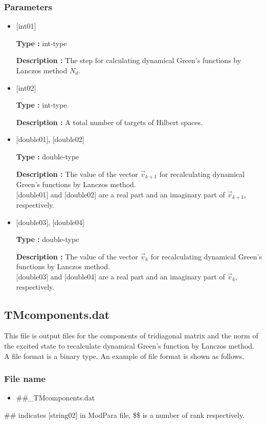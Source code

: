 \subsubsection{Parameters}
 \begin{itemize}

  \item  $[$int01$]$

 {\bf Type :} int-type

 {\bf Description :} The step for calculating dynamical Green's functions by Lanczos method $N_d$.

  \item  $[$int02$]$

 {\bf Type :} int-type

{\bf Description :}  A total number of targets of Hilbert spaces.

 
 \item  $[$double01$]$, $[$double02$]$

 {\bf Type :} double-type 

{\bf Description :} The value of the vector $\vec{v}_{k+1}$ for recalculating dynamical Green's functions by Lanczos method.\\
$[$double01$]$ and $[$double02$]$ are a real part and an imaginary part of $\vec{v}_{k+1}$, respectively.

\item  $[$double03$]$, $[$double04$]$

 {\bf Type :} double-type 

{\bf Description :} The value of the vector $\vec{v}_{k}$ for recalculating dynamical Green's functions by Lanczos method.\\
$[$double03$]$ and $[$double04$]$ are a real part and an imaginary part of $\vec{v}_{k}$, respectively.
\end{itemize}

\newpage
\subsection{{TMcomponents.dat}}
\label{Subsec:restart}
This file is output files for the components of tridiagonal matrix and the norm of the excited state to recalculate dynamical Green's function by Lanczos method. 
A file format is a binary type. 
An example of file format is shown as follows.

\subsubsection{File name}
\begin{itemize}
   \item{\#\#\_TMcomponents.dat}
\end{itemize}
\#\# indicates [string02] in ModPara file, \$\$ is a number of rank respectively. 

